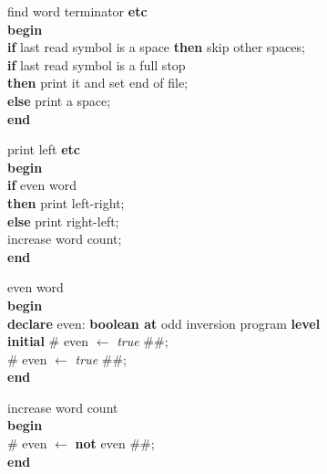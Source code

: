 \documentclass[openany,nobib]{tufte-book}
\newcommand{\kw}[1]{{\bf #1}}
\begin{document}
\bigskip

\noindent find word terminator \kw{etc} \\
\-\hspace{0.2cm} \kw{begin} \\
\-\hspace{0.4cm} \kw{if} last read symbol is a space \kw{then} skip other
spaces;\\
\-\hspace{0.4cm} \kw{if} last read symbol is a full stop\\
\-\hspace{0.7cm} \kw{then} print it and set end of file;\\
\-\hspace{0.7cm} \kw{else} print a space;\\
\-\hspace{0.2cm} \kw{end}

\bigskip

\noindent print left \kw{etc} \\
\-\hspace{0.2cm} \kw{begin} \\
\-\hspace{0.4cm} \kw{if} even word\\
\-\hspace{0.7cm} \kw{then} print left-right;\\
\-\hspace{0.7cm} \kw{else} print right-left;\\
\-\hspace{0.4cm} increase word count;\\
\-\hspace{0.2cm} \kw{end}

\clearpage

\noindent even word\\
\-\hspace{0.2cm} \kw{begin} \\
\-\hspace{0.4cm} \kw{declare} even: \kw{boolean at} odd inversion program
\kw{level}\\
\-\hspace{0.4cm} \kw{initial} \# even $\gets$ {\it true} \#\#;\\
\-\hspace{0.4cm} \# even $\gets$ {\it true} \#\#;\\
\-\hspace{0.2cm} \kw{end}

\bigskip

\noindent increase word count\\
\-\hspace{0.2cm} \kw{begin} \\
\-\hspace{0.4cm} \# even $\gets$ \kw{not} even \#\#;\\
\-\hspace{0.2cm} \kw{end}
\end{document}
